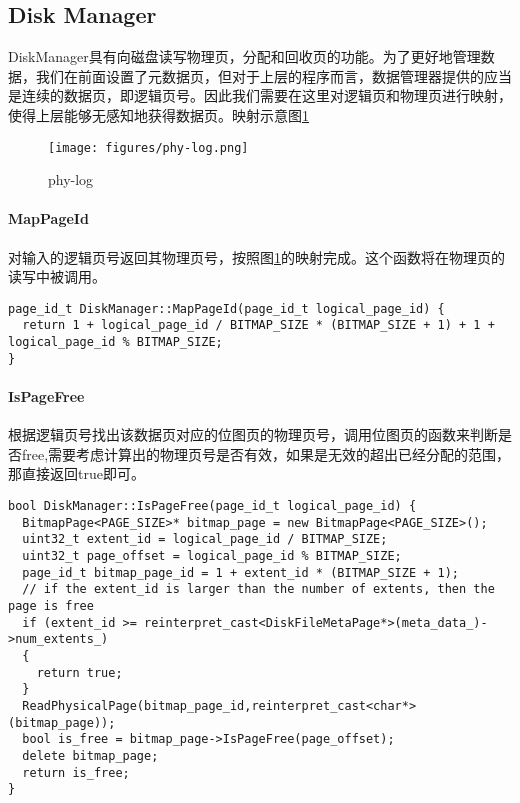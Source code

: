 \documentclass[12pt,hyperref,a4paper,UTF8]{ctexart}
\begin{document}
\subsection{Disk Manager}

DiskManager具有向磁盘读写物理页，分配和回收页的功能。为了更好地管理数据，我们在前面设置了元数据页，但对于上层的程序而言，数据管理器提供的应当是连续的数据页，即逻辑页号。因此我们需要在这里对逻辑页和物理页进行映射，使得上层能够无感知地获得数据页。映射示意图\ref{fig:phy-log}

\begin{figure}[!htbp]
    \centering
    \texttt{[image: figures/phy-log.png]}
    \caption{phy-log}
    \label{fig:phy-log}
\end{figure}

\paragraph{MapPageId}
对输入的逻辑页号返回其物理页号，按照图\ref{fig:phy-log}的映射完成。这个函数将在物理页的读写中被调用。
\begin{verbatim}
page_id_t DiskManager::MapPageId(page_id_t logical_page_id) {
  return 1 + logical_page_id / BITMAP_SIZE * (BITMAP_SIZE + 1) + 1 + logical_page_id % BITMAP_SIZE;
}
\end{verbatim}

\paragraph{IsPageFree}
根据逻辑页号找出该数据页对应的位图页的物理页号，调用位图页的函数来判断是否free,需要考虑计算出的物理页号是否有效，如果是无效的超出已经分配的范围，那直接返回true即可。
\begin{verbatim}
bool DiskManager::IsPageFree(page_id_t logical_page_id) {
  BitmapPage<PAGE_SIZE>* bitmap_page = new BitmapPage<PAGE_SIZE>();
  uint32_t extent_id = logical_page_id / BITMAP_SIZE;
  uint32_t page_offset = logical_page_id % BITMAP_SIZE;
  page_id_t bitmap_page_id = 1 + extent_id * (BITMAP_SIZE + 1);
  // if the extent_id is larger than the number of extents, then the page is free
  if (extent_id >= reinterpret_cast<DiskFileMetaPage*>(meta_data_)->num_extents_)
  {
    return true;
  }
  ReadPhysicalPage(bitmap_page_id,reinterpret_cast<char*>(bitmap_page));
  bool is_free = bitmap_page->IsPageFree(page_offset);
  delete bitmap_page;
  return is_free;
}
\end{verbatim}
\end{document}
